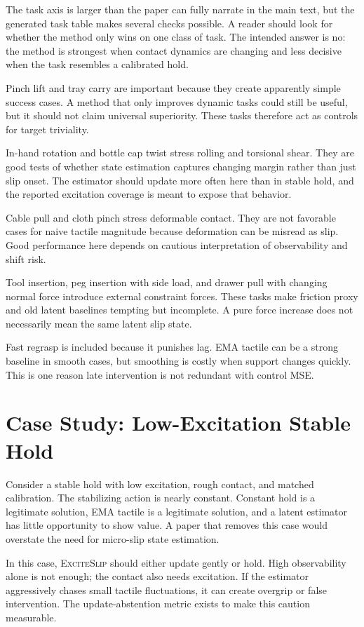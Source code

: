 \documentclass{article}
\newcommand{\method}{\textsc{ExciteSlip}\xspace}
\begin{document}
The task axis is larger than the paper can fully narrate in the main text, but the generated task table makes several checks possible. A reader should look for whether the method only wins on one class of task. The intended answer is no: the method is strongest when contact dynamics are changing and less decisive when the task resembles a calibrated hold.

Pinch lift and tray carry are important because they create apparently simple success cases. A method that only improves dynamic tasks could still be useful, but it should not claim universal superiority. These tasks therefore act as controls for target triviality.

In-hand rotation and bottle cap twist stress rolling and torsional shear. They are good tests of whether state estimation captures changing margin rather than just slip onset. The estimator should update more often here than in stable hold, and the reported excitation coverage is meant to expose that behavior.

Cable pull and cloth pinch stress deformable contact. They are not favorable cases for naive tactile magnitude because deformation can be misread as slip. Good performance here depends on cautious interpretation of observability and shift risk.

Tool insertion, peg insertion with side load, and drawer pull with changing normal force introduce external constraint forces. These tasks make friction proxy and old latent baselines tempting but incomplete. A pure force increase does not necessarily mean the same latent slip state.

Fast regrasp is included because it punishes lag. EMA tactile can be a strong baseline in smooth cases, but smoothing is costly when support changes quickly. This is one reason late intervention is not redundant with control MSE.

\section{Case Study: Low-Excitation Stable Hold}

Consider a stable hold with low excitation, rough contact, and matched calibration. The stabilizing action is nearly constant. Constant hold is a legitimate solution, EMA tactile is a legitimate solution, and a latent estimator has little opportunity to show value. A paper that removes this case would overstate the need for micro-slip state estimation.

In this case, \method should either update gently or hold. High observability alone is not enough; the contact also needs excitation. If the estimator aggressively chases small tactile fluctuations, it can create overgrip or false intervention. The update-abstention metric exists to make this caution measurable.
\end{document}
